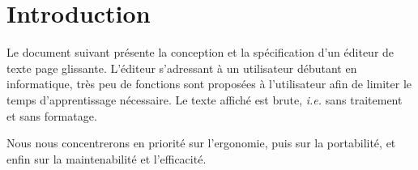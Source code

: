 \part{Introduction}
Le document suivant présente la conception et la spécification d'un éditeur de texte page glissante. L'éditeur s'adressant à un utilisateur débutant en informatique, très peu de fonctions sont proposées à l'utilisateur afin de limiter le temps d'apprentissage nécessaire. Le texte affiché est brute, \textsl{i.e.} sans traitement et sans formatage.

Nous nous concentrerons en priorité sur l'ergonomie, puis sur la portabilité, et enfin sur la maintenabilité et l'efficacité.
